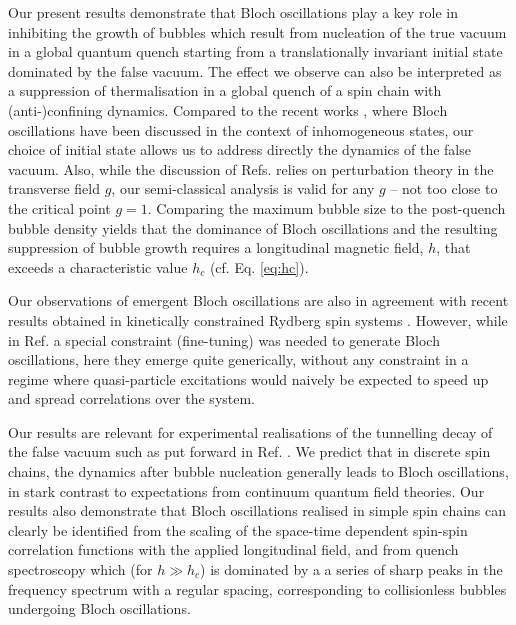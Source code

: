 \documentclass[amsmath,amssymb,11pt]{article}
\numberwithin{equation}{section}
\numberwithin{figure}{section}
\numberwithin{table}{section}
\begin{document}
Our present results demonstrate that Bloch oscillations play a key role in inhibiting the growth of bubbles which result from nucleation of the true vacuum in a global quantum quench starting from a translationally invariant initial state dominated by the false vacuum. The effect we observe can also be interpreted as a suppression of thermalisation in a global quench of a spin chain with (anti-)confining dynamics. Compared to the recent works \cite{2019PhRvB..99r0302M,2020PhRvB.102d1118L}, where Bloch oscillations have been discussed in the context of inhomogeneous states, our choice of initial state allows us to address directly the dynamics of the false vacuum.  Also, while the discussion of Refs.\cite{2019PhRvB..99r0302M,2020PhRvB.102d1118L} relies  on perturbation theory in the transverse field $g$,  our  semi-classical analysis  is valid for any $g$ -- not too close to the critical point $g=1$. Comparing the maximum bubble size to the post-quench bubble density yields that the dominance of Bloch oscillations and the resulting suppression of bubble growth requires a longitudinal magnetic field, $h$, that exceeds a characteristic value $h_c$ (cf. Eq. \eqref{eq:hc}). 

Our observations of emergent Bloch oscillations are also in agreement with recent results obtained in kinetically constrained Rydberg spin systems \cite{Magoni:2020kfb}. However, while in Ref. \cite{Magoni:2020kfb} a special constraint (fine-tuning) was needed to generate Bloch oscillations, here they emerge quite generically, without any constraint in a regime where quasi-particle excitations would naively be expected to speed up and spread correlations over the system. 

Our results are relevant for experimental realisations of the tunnelling decay of the false vacuum such as put forward in Ref. \cite{Abel_2021}. We predict that in  discrete spin chains, the dynamics after bubble nucleation generally leads to Bloch oscillations, in stark contrast to expectations from continuum quantum field theories. Our results also demonstrate that Bloch oscillations realised in simple spin chains can clearly be identified from the scaling  of the space-time dependent spin-spin correlation functions with the applied longitudinal field, and from quench spectroscopy which (for $h\gg h_c$) is dominated by a a series of sharp peaks in the frequency spectrum with a regular spacing,  corresponding to collisionless bubbles undergoing Bloch oscillations.
\end{document}
